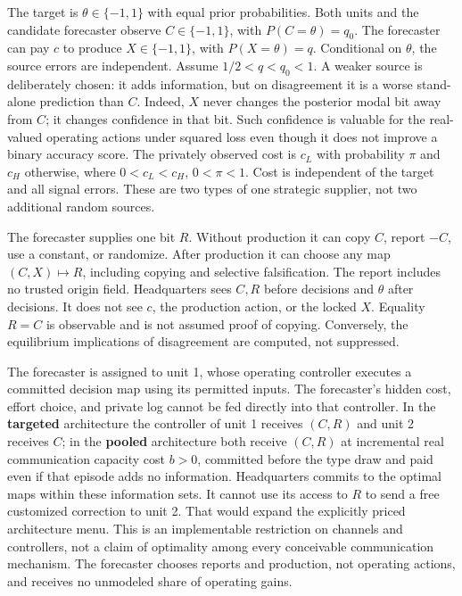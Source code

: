 \documentclass[
  11pt,
]{article}
\begin{document}
The target is \(\theta\in\{-1,1\}\) with equal prior probabilities. Both
units and the candidate forecaster observe \(C\in\{-1,1\}\), with
\(P(C=\theta)=q_0\). The forecaster can pay \(c\) to produce
\(X\in\{-1,1\}\), with \(P(X=\theta)=q\). Conditional on \(\theta\), the
source errors are independent. Assume \(1/2<q<q_0<1\). A weaker source
is deliberately chosen: it adds information, but on disagreement it is a
worse stand-alone prediction than \(C\). Indeed, \(X\) never changes the
posterior modal bit away from \(C\); it changes confidence in that bit.
Such confidence is valuable for the real-valued operating actions under
squared loss even though it does not improve a binary accuracy score.
The privately observed cost is \(c_L\) with probability \(\pi\) and
\(c_H\) otherwise, where \(0<c_L<c_H\), \(0<\pi<1\). Cost is independent
of the target and all signal errors. These are two types of one
strategic supplier, not two additional random sources.

The forecaster supplies one bit \(R\). Without production it can copy
\(C\), report \(-C\), use a constant, or randomize. After production it
can choose any map \((C,X)\mapsto R\), including copying and selective
falsification. The report includes no trusted origin field. Headquarters
sees \(C,R\) before decisions and \(\theta\) after decisions. It does
not see \(c\), the production action, or the locked \(X\). Equality
\(R=C\) is observable and is not assumed proof of copying. Conversely,
the equilibrium implications of disagreement are computed, not
suppressed.

The forecaster is assigned to unit 1, whose operating controller
executes a committed decision map using its permitted inputs. The
forecaster's hidden cost, effort choice, and private log cannot be fed
directly into that controller. In the \textbf{targeted} architecture the
controller of unit 1 receives \((C,R)\) and unit 2 receives \(C\); in
the \textbf{pooled} architecture both receive \((C,R)\) at incremental
real communication capacity cost \(b>0\), committed before the type draw
and paid even if that episode adds no information. Headquarters commits
to the optimal maps within these information sets. It cannot use its
access to \(R\) to send a free customized correction to unit 2. That
would expand the explicitly priced architecture menu. This is an
implementable restriction on channels and controllers, not a claim of
optimality among every conceivable communication mechanism. The
forecaster chooses reports and production, not operating actions, and
receives no unmodeled share of operating gains.
\end{document}
